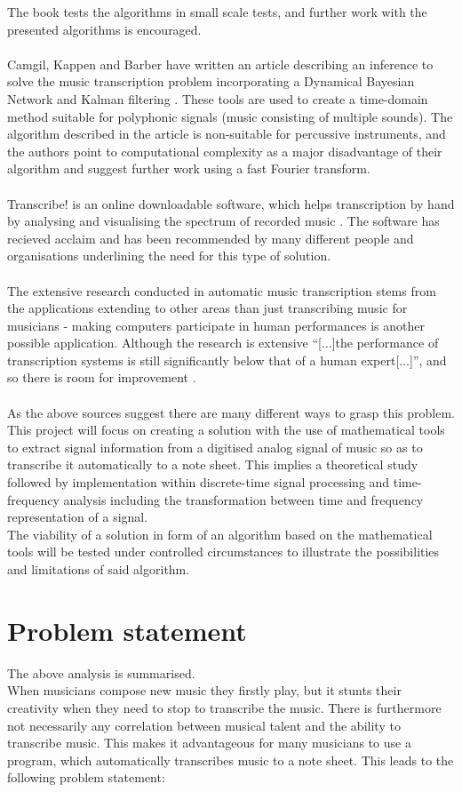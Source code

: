 The book tests the algorithms in small scale tests, and further work with the presented algorithms is encouraged.
\\ \\
Camgil, Kappen and Barber have written an article describing an inference to solve the music transcription problem incorporating a Dynamical Bayesian Network and Kalman filtering \cite{sol2}.
These tools are used to create a time-domain method suitable for polyphonic signals (music consisting of multiple sounds). 
The algorithm described in the article is non-suitable for percussive instruments, and the authors point to computational complexity as a major disadvantage of their algorithm and suggest further work using a fast Fourier transform.
\\ \\
Transcribe! is an online downloadable software, which helps transcription by hand by analysing and visualising the spectrum of recorded music \cite{transcribe!}. The software has recieved acclaim and has been recommended by many different people and organisations underlining the need for this type of solution.
\\ \\
The extensive research conducted in automatic music transcription stems from the applications extending to other areas than just transcribing music for musicians - making computers participate in human performances is another possible application. Although the research is extensive ``[$\ldots$]the performance of transcription systems is still significantly below that of a human expert[$\ldots$]'', and so there is room for improvement \cite{Benetos2013}.
\\ \\
As the above sources suggest there are many different ways to grasp this problem. This project will focus on creating a solution with the use of mathematical tools to extract signal information from a digitised analog signal of music so as to transcribe it automatically to a note sheet.  
This implies a theoretical study followed by implementation within discrete-time signal processing and time-frequency analysis including the transformation between time and frequency representation of a signal.\\    
The viability of a solution in form of an algorithm based on the mathematical tools will be tested under controlled circumstances to illustrate the possibilities and limitations of said algorithm.

\section{Problem statement}
The above analysis is summarised.\\
When musicians compose new music they firstly play, but it stunts their creativity when they need to stop to transcribe the music. There is furthermore not necessarily any correlation between musical talent and the ability to transcribe music. This makes it advantageous for many musicians to use a program, which automatically transcribes music to a note sheet. This leads to the following problem statement:

